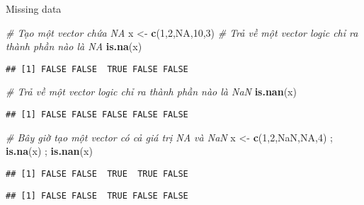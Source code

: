 \documentclass[
  ignorenonframetext,
]{beamer}
\newenvironment{Shaded}{}{}
\newcommand{\CommentTok}[1]{\textcolor[rgb]{0.38,0.63,0.69}{\textit{#1}}}
\newcommand{\DecValTok}[1]{\textcolor[rgb]{0.25,0.63,0.44}{#1}}
\newcommand{\KeywordTok}[1]{\textcolor[rgb]{0.00,0.44,0.13}{\textbf{#1}}}
\newcommand{\NormalTok}[1]{#1}
\newcommand{\OtherTok}[1]{\textcolor[rgb]{0.00,0.44,0.13}{#1}}
\newcommand{\StringTok}[1]{\textcolor[rgb]{0.25,0.44,0.63}{#1}}
\begin{document}
\begin{frame}[fragile]{Missing data}
\protect\hypertarget{missing-data-4}{}

\begin{Shaded}
\begin{Highlighting}[]
\CommentTok{# Tạo một vector chứa NA}
\NormalTok{x <-}\StringTok{ }\KeywordTok{c}\NormalTok{(}\DecValTok{1}\NormalTok{,}\DecValTok{2}\NormalTok{,}\OtherTok{NA}\NormalTok{,}\DecValTok{10}\NormalTok{,}\DecValTok{3}\NormalTok{)}
\CommentTok{# Trả về một vector logic chỉ ra thành phần nào là NA}
\KeywordTok{is.na}\NormalTok{(x)}
\end{Highlighting}
\end{Shaded}

\begin{verbatim}
## [1] FALSE FALSE  TRUE FALSE FALSE
\end{verbatim}

\begin{Shaded}
\begin{Highlighting}[]
\CommentTok{# Trả về một vector logic chỉ ra thành phần nào là NaN}
\KeywordTok{is.nan}\NormalTok{(x)}
\end{Highlighting}
\end{Shaded}

\begin{verbatim}
## [1] FALSE FALSE FALSE FALSE FALSE
\end{verbatim}

\begin{Shaded}
\begin{Highlighting}[]
\CommentTok{# Bây giờ tạo một vector có cả giá trị NA và NaN}
\NormalTok{x <-}\StringTok{ }\KeywordTok{c}\NormalTok{(}\DecValTok{1}\NormalTok{,}\DecValTok{2}\NormalTok{,}\OtherTok{NaN}\NormalTok{,}\OtherTok{NA}\NormalTok{,}\DecValTok{4}\NormalTok{) ; }\KeywordTok{is.na}\NormalTok{(x) ; }\KeywordTok{is.nan}\NormalTok{(x)}
\end{Highlighting}
\end{Shaded}

\begin{verbatim}
## [1] FALSE FALSE  TRUE  TRUE FALSE
\end{verbatim}

\begin{verbatim}
## [1] FALSE FALSE  TRUE FALSE FALSE
\end{verbatim}

\end{frame}
\end{document}
